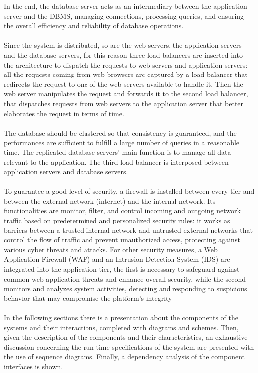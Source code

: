 In the end, the database server acts as an intermediary between the application server and the DBMS, managing connections, processing queries, and ensuring the overall efficiency and reliability of database operations. \\ \\
Since the system is distributed, so are the web servers, the application servers and the database servers, for this reason three load balancers are inserted into the architecture to dispatch the requests to web servers and application servers: all the requests coming from web browsers are captured by a load balancer that redirects the request to one of the web servers available to handle it. Then the web server manipulates the request and forwards it to the second load balancer, that dispatches requests from web servers to the application server that better elaborates the request in terms of time. \\ \\
The database should be clustered so that consistency is guaranteed, and the performances are sufficient to fulfill a large number of queries in a reasonable time. The replicated database servers' main function is to manage all data relevant to the application. The third load balancer is interposed between application servers and database servers. \\ \\
To guarantee a good level of security, a firewall is installed between every tier and between the external network (internet) and the internal network. Its functionalities are monitor, filter, and control incoming and outgoing network traffic based on predetermined and personalized security rules; it works as barriers between a trusted internal network and untrusted external networks that control the flow of traffic and prevent unauthorized access, protecting against various cyber threats and attacks. For other security measures, a Web Application Firewall (WAF) and an Intrusion Detection System (IDS) are integrated into the application tier, the first is necessary to safeguard against common web application threats and enhance overall security, while the second monitors and analyzes system activities, detecting and responding to suspicious behavior that may compromise the platform's integrity. \\ \\
In the following sections there is a presentation about the components of the systems and their interactions, completed with diagrams and schemes. Then, given the description of the components and their characteristics, an exhaustive discussion concerning the run time specifications of the system are presented with the use of sequence diagrams. Finally, a dependency analysis of the component interfaces is shown.

